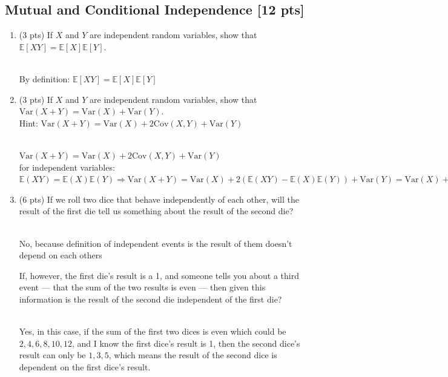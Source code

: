 \documentclass[a4paper]{article}
\theoremstyle{definition}
\newcommand{\Var}{\mathrm{Var}}
\newcommand{\Cov}{\mathrm{Cov}}
\newenvironment{soln}{
	\leavevmode\color{blue}\ignorespaces
}{}
\begin{document}
	\subsection{Mutual and Conditional Independence [12 pts]}
	\begin{enumerate}
		\item (3 pts) If $X$ and $Y$ are independent random variables, show that
		$\mathbb{E}[XY] = \mathbb{E}[X]\mathbb{E}[Y]$.
		
		\begin{soln}\\
		By definition: $\mathbb{E}[XY] = \mathbb{E}[X]\mathbb{E}[Y]$
		\end{soln}
		
		\item (3 pts) If $X$ and $Y$ are independent random variables, show that
		$\Var(X+Y) = \Var(X) + \Var(Y)$. \\
		Hint: $\Var(X+Y) = \Var(X) + 2\Cov(X, Y) + \Var(Y)$
		
		\begin{soln}\\
			$\Var(X+Y) = \Var(X) + 2\Cov(X, Y) + \Var(Y)$ \\
			for independent variables: $\mathbb{E}(XY) = \mathbb{E}(X) \mathbb{E}(Y) \Rightarrow \Var(X+Y) = \Var(X) + 2(\mathbb{E}(XY) - \mathbb{E}(X)\mathbb{E}(Y)) + \Var(Y) = \Var(X) + \Var(Y)$   \\
		\end{soln}
		
		\item (6 pts) If we roll two dice that behave independently of each
		other, will the result of the first die tell us something about the
		result of the second die? 
		
		\begin{soln}\\
		No, because definition of independent events is the result of them doesn't depend on each others\end{soln}
		
		If, however, the first die's result is a 1,
		and someone tells you about a third event --- that the sum of the two
		results is even --- then given this information is the result of the second die
		independent of the first die? 
		
		\begin{soln}\\
		Yes, in this case, if the sum of the first two dices is even which could be ${2,4,6,8,10,12}$, and I know the first dice's result is 1, then the second dice's result can only be ${1,3,5}$, which means the result of the second dice is dependent on the first dice's result.
		\end{soln}
	\end{enumerate}
	
\end{document}
